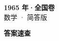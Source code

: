 \documentclass[zihao=-4, a4paper]{ctexart}
\begin{document}
\begin{center}
  {\Large\bfseries 1965 年·全国卷}\\[4pt]
  {\large 数学 · 简答版}
\end{center}
\medskip
{}

\clearpage
{}
\begin{center}{\Large\bfseries 答案速查}\end{center}
\medskip

\end{document}
